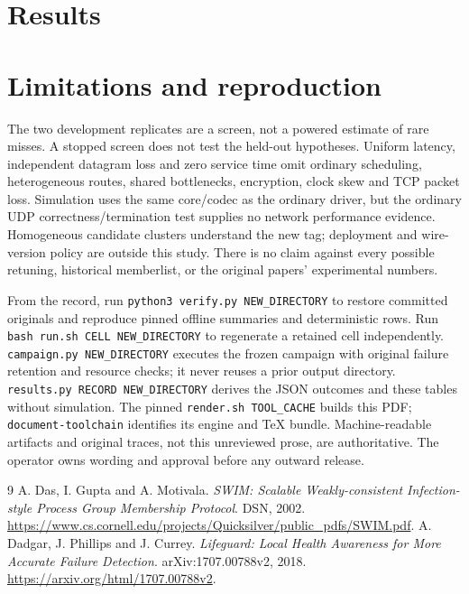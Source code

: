 \documentclass[10pt]{article}
\begin{document}
\section{Results}


\section{Limitations and reproduction}
The two development replicates are a screen, not a powered estimate of
rare misses. A stopped screen does not test the held-out hypotheses.
Uniform latency, independent datagram loss and zero service time omit
ordinary scheduling, heterogeneous routes, shared bottlenecks, encryption,
clock skew and TCP packet loss. Simulation uses the same core/codec as the
ordinary driver, but the ordinary UDP correctness/termination test supplies
no network performance evidence. Homogeneous candidate clusters understand
the new tag; deployment and wire-version policy are outside this study.
There is no claim against every possible retuning, historical memberlist,
or the original papers' experimental numbers.

From the record, run \texttt{python3 verify.py NEW\_DIRECTORY} to restore
committed originals and reproduce pinned offline summaries and deterministic
rows. Run \texttt{bash run.sh CELL NEW\_DIRECTORY} to regenerate a retained
cell independently. \texttt{campaign.py NEW\_DIRECTORY} executes the frozen
campaign with original failure retention and resource checks; it never
reuses a prior output directory. \texttt{results.py RECORD NEW\_DIRECTORY}
derives the JSON outcomes and these tables without simulation. The pinned
\texttt{render.sh TOOL\_CACHE} builds this PDF; \texttt{document-toolchain}
identifies its engine and TeX bundle. Machine-readable artifacts and original
traces, not this unreviewed prose, are authoritative. The operator owns
wording and approval before any outward release.

\begin{thebibliography}{9}
 A. Das, I. Gupta and A. Motivala.
\emph{SWIM: Scalable Weakly-consistent Infection-style Process Group Membership Protocol}.
DSN, 2002. \url{https://www.cs.cornell.edu/projects/Quicksilver/public_pdfs/SWIM.pdf}.
 A. Dadgar, J. Phillips and J. Currey.
\emph{Lifeguard: Local Health Awareness for More Accurate Failure Detection}.
arXiv:1707.00788v2, 2018. \url{https://arxiv.org/html/1707.00788v2}.
\end{thebibliography}
\end{document}
